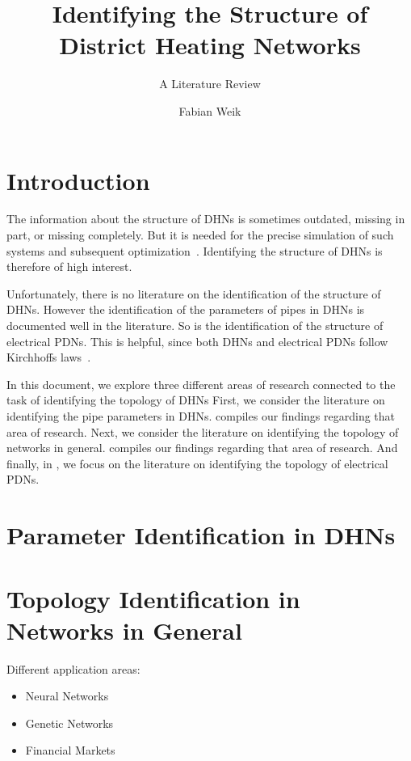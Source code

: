 \documentclass{scrartcl}
\title{Identifying the Structure of \\ District Heating Networks}
\subtitle{A Literature Review}
\author{Fabian Weik}
\begin{document}
    \maketitle

    \section{Introduction}

    The information about the structure of \acp{DHN} is sometimes outdated, missing in part, or missing completely.
    But it is needed for the precise simulation of such systems and subsequent optimization~\cite{adnetheat}.
    Identifying the structure of \acp{DHN} is therefore of high interest.

    Unfortunately, there is no literature on the identification of the structure of \acp{DHN}.
    However the identification of the parameters of pipes in \acp{DHN} is documented well in the literature.
    So is the identification of the structure of electrical \acp{PDN}.
    This is helpful, since both \acp{DHN} and electrical \acp{PDN} follow Kirchhoffs laws~\cite{Moser2016waterelectricitysimilarity}.

    In this document, we explore three different areas of research connected to the task of identifying the topology of \acp{DHN}
    First, we consider the literature on identifying the pipe parameters in \acp{DHN}.
     compiles our findings regarding that area of research.
    Next, we consider the literature on identifying the topology of networks in general.
     compiles our findings regarding that area of research.
    And finally, in , we focus on the literature on identifying the topology of electrical \acp{PDN}.

    \section{Parameter Identification in \acp{DHN}}
    \label{sec:parameter-identification}

    \section{Topology Identification in Networks in General}
    \label{sec:topology-identification}

    Different application areas:
    \begin{itemize}
      \item Neural Networks
      \item Genetic Networks
      \item Financial Markets
    \end{itemize}
\end{document}
